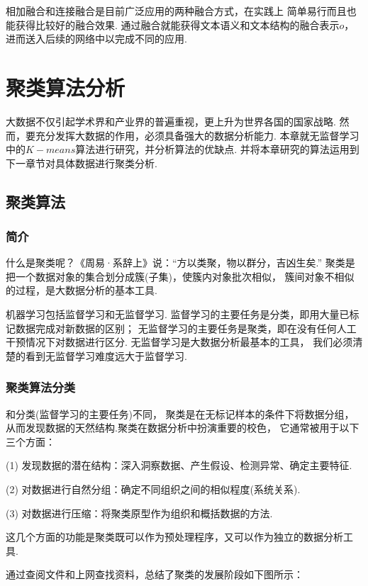 \documentclass[bachelor,adobefonts]{jnuthesis}
\begin{document}
相加融合和连接融合是目前广泛应用的两种融合方式，在实践上
简单易行而且也能获得比较好的融合效果.
通过融合就能获得文本语义和文本结构的融合表示$o$，进而送入后续的网络中以完成不同的应用.


\chapter{聚类算法分析}
大数据不仅引起学术界和产业界的普遍重视，更上升为世界各国的国家战略.
然而，要充分发挥大数据的作用，必须具备强大的数据分析能力.
本章就无监督学习中的$K-means$算法进行研究，并分析算法的优缺点.
并将本章研究的算法运用到下一章节对具体数据进行聚类分析.

\section{聚类算法}
\subsection{简介}
什么是聚类呢？《周易·系辞上》说：“方以类聚，物以群分，吉凶生矣.”
聚类是把一个数据对象的集合划分成簇(子集)，使簇内对象批次相似，
簇间对象不相似的过程，是大数据分析的基本工具.

机器学习包括监督学习和无监督学习.
监督学习的主要任务是分类，即用大量已标记数据完成对新数据的区别；
无监督学习的主要任务是聚类，即在没有任何人工干预情况下对数据进行区分.
无监督学习是大数据分析最基本的工具，
我们必须清楚的看到无监督学习难度远大于监督学习.


\subsection{聚类算法分类}
和分类(监督学习的主要任务)不同，
聚类是在无标记样本的条件下将数据分组，
从而发现数据的天然结构.聚类在数据分析中扮演重要的校色，
它通常被用于以下三个方面：

(1)	发现数据的潜在结构：深入洞察数据、产生假设、检测异常、确定主要特征.

(2)	对数据进行自然分组：确定不同组织之间的相似程度(系统关系).

(3)	对数据进行压缩：将聚类原型作为组织和概括数据的方法.

这几个方面的功能是聚类既可以作为预处理程序，又可以作为独立的数据分析工具.

通过查阅文件和上网查找资料，总结了聚类的发展阶段如下图所示：
\end{document}
